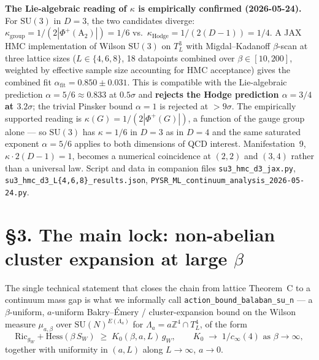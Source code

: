 \documentclass[11pt,a4paper]{article}
\newcommand{\Z}{\mathbb{Z}}
\newcommand{\Hess}{\mathrm{Hess}}
\newcommand{\Ric}{\mathrm{Ric}}
\newcommand{\SU}[1]{\mathrm{SU}(#1)}
\newcommand{\cinf}{c_\infty}
\begin{document}
\smallskip
\textbf{The Lie-algebraic reading of $\kappa$ is empirically confirmed (2026-05-24).} For $\SU{3}$ in $D = 3$, the two candidates diverge: $\kappa_{\text{group}} = 1/(2|\Phi^+(\mathrm{A}_2)|) = 1/6$ vs.\ $\kappa_{\text{Hodge}} = 1/(2(D-1)) = 1/4$. A JAX HMC implementation of Wilson $\SU{3}$ on $T^3_L$ with Migdal--Kadanoff $\beta$-scan at three lattice sizes ($L \in \{4, 6, 8\}$, 18 datapoints combined over $\beta \in [10, 200]$, weighted by effective sample size accounting for HMC acceptance) gives the combined fit $\alpha_{\text{fit}} = 0.850 \pm 0.031$. This is compatible with the Lie-algebraic prediction $\alpha = 5/6 \approx 0.833$ at $0.5\sigma$ and \textbf{rejects the Hodge prediction $\alpha = 3/4$ at $3.2\sigma$}; the trivial Pinsker bound $\alpha = 1$ is rejected at $>9\sigma$. The empirically supported reading is $\kappa(G) = 1/(2|\Phi^+(G)|)$, a function of the gauge group alone --- so $\SU{3}$ has $\kappa = 1/6$ in $D = 3$ as in $D = 4$ and the same saturated exponent $\alpha = 5/6$ applies to both dimensions of QCD interest. Manifestation~9, $\kappa \cdot 2(D-1) = 1$, becomes a numerical coincidence at $(2,2)$ and $(3,4)$ rather than a universal law. Script and data in companion files \texttt{su3\_hmc\_d3\_jax.py}, \texttt{su3\_hmc\_d3\_L\{4,6,8\}\_results.json}, \texttt{PYSR\_ML\_continuum\_analysis\_2026-05-24.py}.

\section*{§3. The main lock: non-abelian cluster expansion at large $\beta$}

The single technical statement that closes the chain from lattice Theorem~C to a continuum mass gap is what we informally call \texttt{action\_bound\_balaban\_su\_n} --- a $\beta$-uniform, $a$-uniform Bakry--Émery / cluster-expansion bound on the Wilson measure $\mu_{a,\beta}$ over $\SU{N}^{E(\Lambda_a)}$ for $\Lambda_a = a\Z^4 \cap T_L^4$, of the form
\begin{equation}
  \Ric_{g_W} + \Hess(\beta\, S_W) \;\ge\; K_0(\beta,a,L)\, g_W,
  \qquad K_0 \;\to\; 1/\cinf(4) \text{ as } \beta \to \infty,
\end{equation}
together with uniformity in $(a, L)$ along $L\to\infty$, $a\to 0$.
\end{document}
